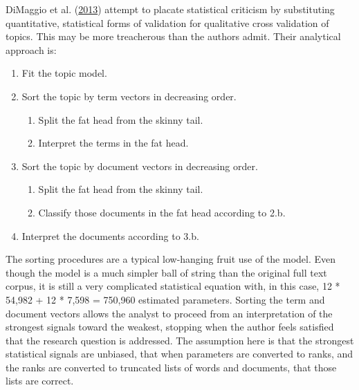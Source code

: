 \documentclass[]{book}
\providecommand{\tightlist}{%
  \setlength{\itemsep}{0pt}\setlength{\parskip}{0pt}}
\theoremstyle{definition}
\theoremstyle{definition}
\theoremstyle{definition}
\theoremstyle{remark}
\begin{document}
DiMaggio et al. (\protect\hyperlink{ref-DiMaggio2013Exploiting}{2013})
attempt to placate statistical criticism by substituting quantitative,
statistical forms of validation for qualitative cross validation of
topics. This may be more treacherous than the authors admit. Their
analytical approach is:

\begin{enumerate}
\def\labelenumi{\arabic{enumi}.}
\tightlist
\item
  Fit the topic model.
\item
  Sort the topic by term vectors in decreasing order.

  \begin{enumerate}
  \def\labelenumii{\alph{enumii}.}
  \tightlist
  \item
    Split the fat head from the skinny tail.
  \item
    Interpret the terms in the fat head.
  \end{enumerate}
\item
  Sort the topic by document vectors in decreasing order.

  \begin{enumerate}
  \def\labelenumii{\alph{enumii}.}
  \tightlist
  \item
    Split the fat head from the skinny tail.
  \item
    Classify those documents in the fat head according to 2.b.
  \end{enumerate}
\item
  Interpret the documents according to 3.b.
\end{enumerate}

The sorting procedures are a typical low-hanging fruit use of the model.
Even though the model is a much simpler ball of string than the original
full text corpus, it is still a very complicated statistical equation
with, in this case, 12 * 54,982 + 12 * 7,598 = 750,960 estimated
parameters. Sorting the term and document vectors allows the analyst to
proceed from an interpretation of the strongest signals toward the
weakest, stopping when the author feels satisfied that the research
question is addressed. The assumption here is that the strongest
statistical signals are unbiased, that when parameters are converted to
ranks, and the ranks are converted to truncated lists of words and
documents, that those lists are correct.
\end{document}
